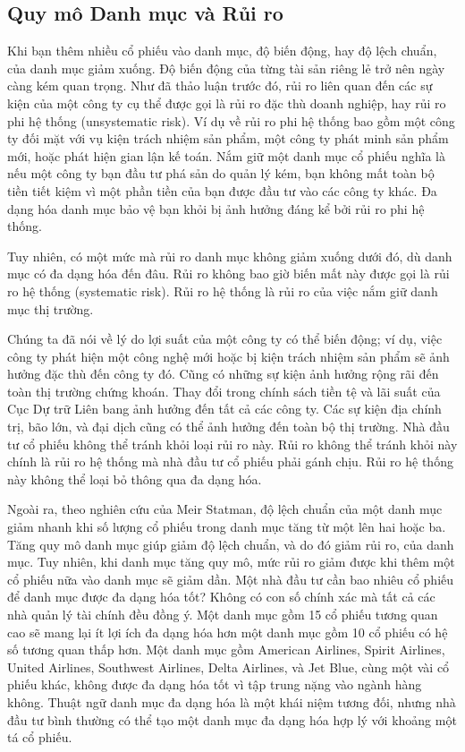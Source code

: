\subsection*{Quy mô Danh mục và Rủi ro}

Khi bạn thêm nhiều cổ phiếu vào danh mục, độ biến động, hay độ lệch chuẩn, của danh mục giảm xuống. Độ biến động của từng tài sản riêng lẻ trở nên ngày càng kém quan trọng. Như đã thảo luận trước đó, rủi ro liên quan đến các sự kiện của một công ty cụ thể được gọi là rủi ro đặc thù doanh nghiệp, hay rủi ro phi hệ thống (unsystematic risk). Ví dụ về rủi ro phi hệ thống bao gồm một công ty đối mặt với vụ kiện trách nhiệm sản phẩm, một công ty phát minh sản phẩm mới, hoặc phát hiện gian lận kế toán. Nắm giữ một danh mục cổ phiếu nghĩa là nếu một công ty bạn đầu tư phá sản do quản lý kém, bạn không mất toàn bộ tiền tiết kiệm vì một phần tiền của bạn được đầu tư vào các công ty khác. Đa dạng hóa danh mục bảo vệ bạn khỏi bị ảnh hưởng đáng kể bởi rủi ro phi hệ thống.

Tuy nhiên, có một mức mà rủi ro danh mục không giảm xuống dưới đó, dù danh mục có đa dạng hóa đến đâu. Rủi ro không bao giờ biến mất này được gọi là rủi ro hệ thống (systematic risk). Rủi ro hệ thống là rủi ro của việc nắm giữ danh mục thị trường.

Chúng ta đã nói về lý do lợi suất của một công ty có thể biến động; ví dụ, việc công ty phát hiện một công nghệ mới hoặc bị kiện trách nhiệm sản phẩm sẽ ảnh hưởng đặc thù đến công ty đó. Cũng có những sự kiện ảnh hưởng rộng rãi đến toàn thị trường chứng khoán. Thay đổi trong chính sách tiền tệ và lãi suất của Cục Dự trữ Liên bang ảnh hưởng đến tất cả các công ty. Các sự kiện địa chính trị, bão lớn, và đại dịch cũng có thể ảnh hưởng đến toàn bộ thị trường. Nhà đầu tư cổ phiếu không thể tránh khỏi loại rủi ro này. Rủi ro không thể tránh khỏi này chính là rủi ro hệ thống mà nhà đầu tư cổ phiếu phải gánh chịu. Rủi ro hệ thống này không thể loại bỏ thông qua đa dạng hóa.

Ngoài ra, theo nghiên cứu của Meir Statman, độ lệch chuẩn của một danh mục giảm nhanh khi số lượng cổ phiếu trong danh mục tăng từ một lên hai hoặc ba. Tăng quy mô danh mục giúp giảm độ lệch chuẩn, và do đó giảm rủi ro, của danh mục. Tuy nhiên, khi danh mục tăng quy mô, mức rủi ro giảm được khi thêm một cổ phiếu nữa vào danh mục sẽ giảm dần. Một nhà đầu tư cần bao nhiêu cổ phiếu để danh mục được đa dạng hóa tốt? Không có con số chính xác mà tất cả các nhà quản lý tài chính đều đồng ý. Một danh mục gồm 15 cổ phiếu tương quan cao sẽ mang lại ít lợi ích đa dạng hóa hơn một danh mục gồm 10 cổ phiếu có hệ số tương quan thấp hơn. Một danh mục gồm American Airlines, Spirit Airlines, United Airlines, Southwest Airlines, Delta Airlines, và Jet Blue, cùng một vài cổ phiếu khác, không được đa dạng hóa tốt vì tập trung nặng vào ngành hàng không. Thuật ngữ danh mục đa dạng hóa là một khái niệm tương đối, nhưng nhà đầu tư bình thường có thể tạo một danh mục đa dạng hóa hợp lý với khoảng một tá cổ phiếu.
